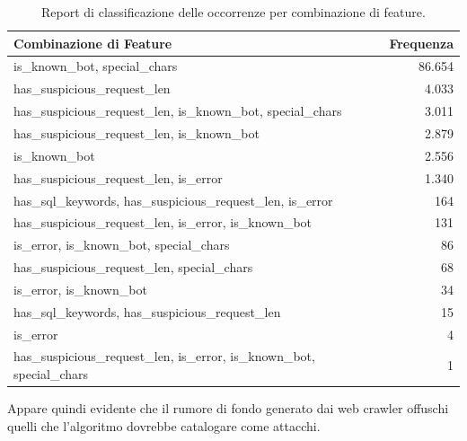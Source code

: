 \begin{table}[H]
      \centering
      \begin{tabular}{|l|r|}
            \hline
            \textbf{Combinazione di Feature}                                         & \textbf{Frequenza} \\
            \hline
            is\_known\_bot, special\_chars                                           & 86.654             \\
            has\_suspicious\_request\_len                                            & 4.033              \\
            has\_suspicious\_request\_len, is\_known\_bot, special\_chars            & 3.011              \\
            has\_suspicious\_request\_len, is\_known\_bot                            & 2.879              \\
            is\_known\_bot                                                           & 2.556              \\
            has\_suspicious\_request\_len, is\_error                                 & 1.340              \\
            has\_sql\_keywords, has\_suspicious\_request\_len, is\_error             & 164                \\
            has\_suspicious\_request\_len, is\_error, is\_known\_bot                 & 131                \\
            is\_error, is\_known\_bot, special\_chars                                & 86                 \\
            has\_suspicious\_request\_len, special\_chars                            & 68                 \\
            is\_error, is\_known\_bot                                                & 34                 \\
            has\_sql\_keywords, has\_suspicious\_request\_len                        & 15                 \\
            is\_error                                                                & 4                  \\
            has\_suspicious\_request\_len, is\_error, is\_known\_bot, special\_chars & 1                  \\
            \hline
      \end{tabular}
      \caption{Report di classificazione delle occorrenze per combinazione di feature.}
\end{table}

Appare quindi evidente che il rumore di fondo generato dai web crawler offuschi quelli che l'algoritmo dovrebbe catalogare come attacchi.